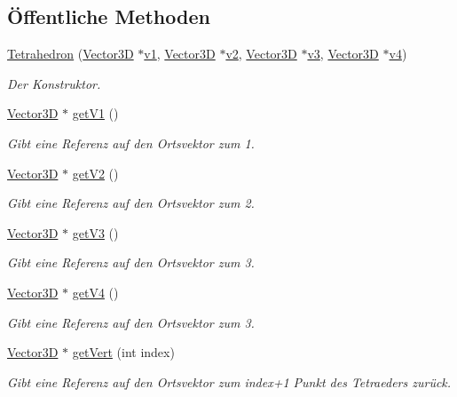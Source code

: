 \subsection*{Öffentliche Methoden}
\begin{DoxyCompactItemize}
\item 
\hyperlink{classTetrahedron_a84e19dba5735a455269abca8229b4bb4}{Tetrahedron} (\hyperlink{classVector3D}{Vector3\-D} $\ast$\hyperlink{particle__sim_2ParticleSystem_8h_a8d89db3c6515289b4df99467371c544f}{v1}, \hyperlink{classVector3D}{Vector3\-D} $\ast$\hyperlink{particle__sim_2ParticleSystem_8h_aadda57ca88b1f7b495ff17bc402bb584}{v2}, \hyperlink{classVector3D}{Vector3\-D} $\ast$\hyperlink{particle__sim_2ParticleSystem_8h_ac3e04ab93bb7f4e1e62ac7311bf75293}{v3}, \hyperlink{classVector3D}{Vector3\-D} $\ast$\hyperlink{particle__sim_2ParticleSystem_8h_a601d75fa74098fd47a857d5afddb6830}{v4})
\begin{DoxyCompactList}\small\item\em Der Konstruktor. \end{DoxyCompactList}\item 
\hyperlink{classVector3D}{Vector3\-D} $\ast$ \hyperlink{classTetrahedron_add51e42ab17afbd023d47a436ce24b0d}{get\-V1} ()
\begin{DoxyCompactList}\small\item\em Gibt eine Referenz auf den Ortsvektor zum 1. \end{DoxyCompactList}\item 
\hyperlink{classVector3D}{Vector3\-D} $\ast$ \hyperlink{classTetrahedron_aa728c967f17e2b8408009b5f2b77a17a}{get\-V2} ()
\begin{DoxyCompactList}\small\item\em Gibt eine Referenz auf den Ortsvektor zum 2. \end{DoxyCompactList}\item 
\hyperlink{classVector3D}{Vector3\-D} $\ast$ \hyperlink{classTetrahedron_aa539a97f133ea621520121acb2ef4a7e}{get\-V3} ()
\begin{DoxyCompactList}\small\item\em Gibt eine Referenz auf den Ortsvektor zum 3. \end{DoxyCompactList}\item 
\hyperlink{classVector3D}{Vector3\-D} $\ast$ \hyperlink{classTetrahedron_a7308b7b73edeba7782dff551a03095bf}{get\-V4} ()
\begin{DoxyCompactList}\small\item\em Gibt eine Referenz auf den Ortsvektor zum 3. \end{DoxyCompactList}\item 
\hyperlink{classVector3D}{Vector3\-D} $\ast$ \hyperlink{classTetrahedron_a88afe41ae5991168ad51ba4dbb2e1a6b}{get\-Vert} (int index)
\begin{DoxyCompactList}\small\item\em Gibt eine Referenz auf den Ortsvektor zum index+1 Punkt des Tetraeders zurück. \end{DoxyCompactList}\end{DoxyCompactItemize}
